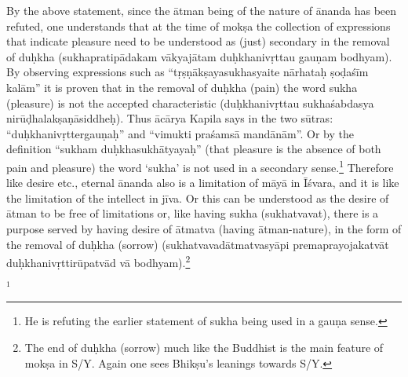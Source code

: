 By the above statement, since the ātman being of the nature of ānanda has been refuted, one understands that at the time of mokṣa the collection of expressions that indicate pleasure need to be understood as (just) secondary in the removal of duḥkha (sukhapratipādakam vākyajātam duḥkhanivṛttau gauṇam bodhyam). By observing expressions such as “tṛṣṇākṣayasukhasyaite nārhataḥ ṣoḍaśīm kalām” it is proven that in the removal of duḥkha (pain) the word sukha (pleasure) is not the accepted characteristic (duḥkhanivṛttau sukhaśabdasya nirūḍhalakṣaṇāsiddheḥ). Thus ācārya Kapila says in the two sūtras: “duḥkhanivṛttergauṇaḥ” and “vimukti praśamsā mandānām”. Or by the definition “sukham duḥkhasukhātyayaḥ” (that pleasure is the absence of both pain and pleasure) the word ‘sukha’ is not used in a secondary sense.\footnote{He is refuting the earlier statement of sukha being used in a gauṇa sense.} Therefore like desire etc., eternal ānanda also is a limitation of māyā in Īśvara, and it is like the limitation of the intellect in jīva. Or this can be understood as the desire of ātman to be free of limitations or, like having sukha (sukhatvavat), there is a purpose served by having desire of ātmatva (having ātman-nature), in the form of the removal of duḥkha (sorrow) (sukhatvavadātmatvasyāpi premaprayojakatvāt duḥkhanivṛttirūpatvād vā bodhyam).\footnote{The end of duḥkha (sorrow) much like the Buddhist is the main feature of mokṣa in S/Y. Again one sees
Bhikṣu’s leanings towards S/Y.} 

$^{1}$


